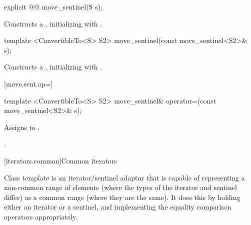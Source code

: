 %
\begin{itemdecl}
explicit @@ move_sentinel(S s);
\end{itemdecl}

\begin{itemdescr}
\pnum
\effects Constructs a , initializing
 with .
\end{itemdescr}

%
\begin{itemdecl}
template <ConvertibleTo<S> S2>
  move_sentinel(const move_sentinel<S2>& s);
\end{itemdecl}

\begin{itemdescr}
\pnum
\effects Constructs a , initializing
 with .
\end{itemdescr}

[move.sent.op=]{}

%
%
\begin{itemdecl}
template <ConvertibleTo<S> S2>
  move_sentinel& operator=(const move_sentinel<S2>& s);
\end{itemdecl}

\begin{itemdescr}
\pnum
\effects Assigns  to .

\pnum
\returns {}.
\end{itemdescr}



[iterators.common]{Common iterators}


\pnum
Class template  is an iterator/sentinel adaptor that is
capable of representing a non-common range of elements (where the types of the
iterator and sentinel differ) as a common range (where they are the same). It
does this by holding either an iterator or a sentinel, and implementing the
equality comparison operators appropriately.


